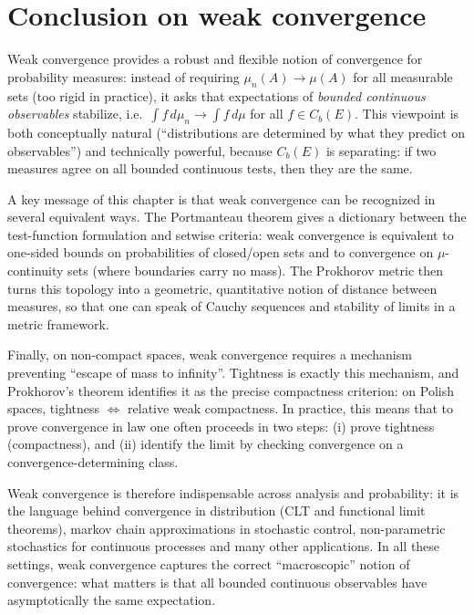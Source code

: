 \section{Conclusion on weak convergence}

Weak convergence provides a robust and flexible notion of convergence for probability measures: instead of requiring
$\mu_n(A)\to\mu(A)$ for all measurable sets (too rigid in practice), it asks that expectations of \emph{bounded continuous observables}
stabilize, i.e.\ $\int f\,d\mu_n\to\int f\,d\mu$ for all $f\in C_b(E)$.
This viewpoint is both conceptually natural (``distributions are determined by what they predict on observables'')
and technically powerful, because $C_b(E)$ is separating: if two measures agree on all bounded continuous tests,
then they are the same.

A key message of this chapter is that weak convergence can be recognized in several equivalent ways.
The Portmanteau theorem gives a dictionary between the test-function formulation and setwise criteria:
weak convergence is equivalent to one-sided bounds on probabilities of closed/open sets and to convergence on
$\mu$-continuity sets (where boundaries carry no mass).
The Prokhorov metric then turns this topology into a geometric, quantitative notion of distance between measures,
so that one can speak of Cauchy sequences and stability of limits in a metric framework.

Finally, on non-compact spaces, weak convergence requires a mechanism preventing ``escape of mass to infinity''.
Tightness is exactly this mechanism, and Prokhorov’s theorem identifies it as the precise compactness criterion:
on Polish spaces, tightness $\Longleftrightarrow$ relative weak compactness.
In practice, this means that to prove convergence in law one often proceeds in two steps:
(i) prove tightness (compactness), and (ii) identify the limit by checking convergence on a convergence-determining class.

Weak convergence is therefore indispensable across analysis and probability:
it is the language behind convergence in distribution (CLT and functional limit theorems),
markov chain approximations in stochastic control, non-parametric stochastics for continuous processes and many other applications.
In all these settings, weak convergence captures the correct ``macroscopic'' notion of convergence:
what matters is that all bounded continuous observables have asymptotically the same expectation.







